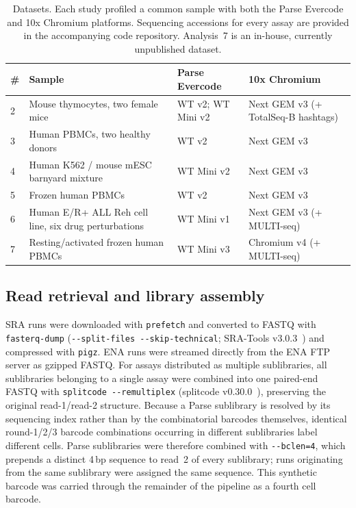 \begin{table}[t]
\centering
\footnotesize
\setlength{\tabcolsep}{5pt}
\caption{Datasets. Each study profiled a common sample with both the Parse Evercode
and 10x Chromium platforms. Sequencing accessions for every assay are provided in the
accompanying code repository. Analysis~7 is an in-house, currently unpublished
dataset.}
\label{tab:datasets}
\begin{tabular}{@{}p{} p{} p{} p{}@{}}
\hline
\# & Sample & Parse Evercode & 10x Chromium \\
\hline
2 & Mouse thymocytes, two female mice & WT v2; WT Mini v2 & Next GEM v3 (+ TotalSeq-B hashtags) \\
3 & Human PBMCs, two healthy donors & WT v2 & Next GEM v3 \\
4 & Human K562 / mouse mESC barnyard mixture & WT Mini v2 & Next GEM v3 \\
5 & Frozen human PBMCs & WT v2 & Next GEM v3 \\
6 & Human E/R+ ALL Reh cell line, six drug perturbations & WT Mini v1 & Next GEM v3 (+ MULTI-seq) \\
7 & Resting/activated frozen human PBMCs & WT Mini v3 & Chromium v4 (+ MULTI-seq) \\
\hline
\end{tabular}
\end{table}

\subsection{Read retrieval and library assembly}

SRA runs were downloaded with \texttt{prefetch} and converted to FASTQ with
\texttt{fasterq-dump} (\texttt{-{}-split-files -{}-skip-technical}; SRA-Tools
v3.0.3~\cite{leinonen2011sra}) and compressed with \texttt{pigz}. ENA runs were
streamed directly from the ENA FTP server as gzipped FASTQ. For assays distributed as
multiple sublibraries, all sublibraries belonging to a single assay were combined
into one paired-end FASTQ with \texttt{splitcode -{}-remultiplex} (splitcode
v0.30.0~\cite{sullivan2024splitcode}), preserving the original
read-1/read-2 structure. Because a Parse sublibrary is resolved by its sequencing
index rather than by the combinatorial barcodes themselves, identical round-1/2/3
barcode combinations occurring in different sublibraries label different cells. Parse
sublibraries were therefore combined with \texttt{-{}-bclen=4}, which prepends a
distinct 4\,bp sequence to read~2 of every sublibrary; runs originating from the same
sublibrary were assigned the same sequence. This synthetic barcode was carried through
the remainder of the pipeline as a fourth cell barcode.

